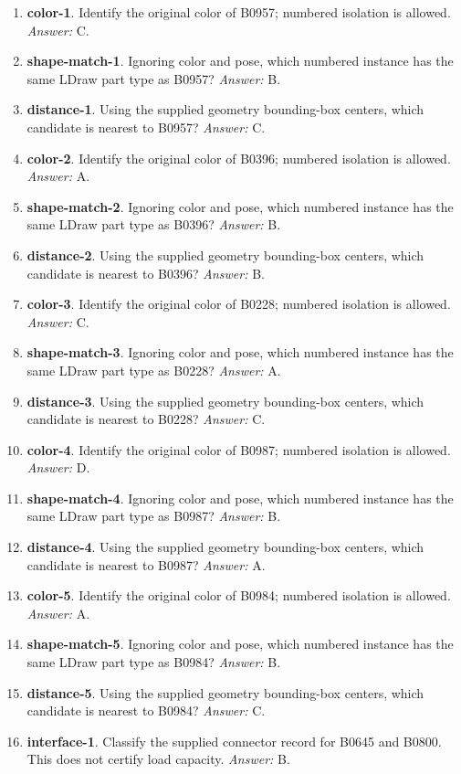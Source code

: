 \begin{enumerate}
\item \textbf{color-1}. Identify the original color of B0957; numbered isolation is allowed. \textit{Answer:} C.
\item \textbf{shape-match-1}. Ignoring color and pose, which numbered instance has the same LDraw part type as B0957? \textit{Answer:} B.
\item \textbf{distance-1}. Using the supplied geometry bounding-box centers, which candidate is nearest to B0957? \textit{Answer:} C.
\item \textbf{color-2}. Identify the original color of B0396; numbered isolation is allowed. \textit{Answer:} A.
\item \textbf{shape-match-2}. Ignoring color and pose, which numbered instance has the same LDraw part type as B0396? \textit{Answer:} B.
\item \textbf{distance-2}. Using the supplied geometry bounding-box centers, which candidate is nearest to B0396? \textit{Answer:} B.
\item \textbf{color-3}. Identify the original color of B0228; numbered isolation is allowed. \textit{Answer:} C.
\item \textbf{shape-match-3}. Ignoring color and pose, which numbered instance has the same LDraw part type as B0228? \textit{Answer:} A.
\item \textbf{distance-3}. Using the supplied geometry bounding-box centers, which candidate is nearest to B0228? \textit{Answer:} C.
\item \textbf{color-4}. Identify the original color of B0987; numbered isolation is allowed. \textit{Answer:} D.
\item \textbf{shape-match-4}. Ignoring color and pose, which numbered instance has the same LDraw part type as B0987? \textit{Answer:} B.
\item \textbf{distance-4}. Using the supplied geometry bounding-box centers, which candidate is nearest to B0987? \textit{Answer:} A.
\item \textbf{color-5}. Identify the original color of B0984; numbered isolation is allowed. \textit{Answer:} A.
\item \textbf{shape-match-5}. Ignoring color and pose, which numbered instance has the same LDraw part type as B0984? \textit{Answer:} B.
\item \textbf{distance-5}. Using the supplied geometry bounding-box centers, which candidate is nearest to B0984? \textit{Answer:} C.
\item \textbf{interface-1}. Classify the supplied connector record for B0645 and B0800. This does not certify load capacity. \textit{Answer:} B.

\end{enumerate}
